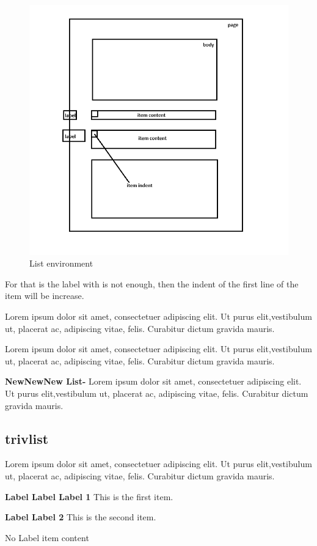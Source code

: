 \documentclass[draft]{article}
\def\text{Lorem ipsum dolor sit amet, consectetuer adipiscing elit.%
Ut purus elit,vestib\-ulum ut, placerat ac, adipiscing vitae, felis. Curabitur dictum gravida%
mauris.}
\begin{document}
\begin{figure}[!htb]
  \centering
  \includegraphics[width=.85\linewidth]{./list.png}
  \caption{List environment}
  \label{fig:List-env}
\end{figure}

For that is the label with is not enough, then the indent of the first line of the item will be increase.

\newenvironment{newlist}{
\begin{list}{\textbf{Newlist-\Roman{Bean}}}{
  \usecounter{Bean}
  \setlength{\leftmargin}{0pt}
  \setlength{\rightmargin}{0pt}
  \setlength{\labelwidth}{0em}
  \setlength{\labelsep}{2ex}
  \setlength{\itemindent}{2ex}
  \setlength{\parsep}{2em plus .5em minus 1.5em}
}
}{\end{list}}

\begin{newlist}
\item \text 
\item \text\setcounter{Bean}{10}
\item[\textbf{NewNewNew List-\Roman{Bean}}] \text
\end{newlist}


\subsection{trivlist}
\text
\begin{trivlist}
  \item[\textbf{Label Label Label 1}] This is the first item.
  \item[\textbf{Label Label 2}] This is the second item.
  \item No Label item content
\end{trivlist}
\end{document}
